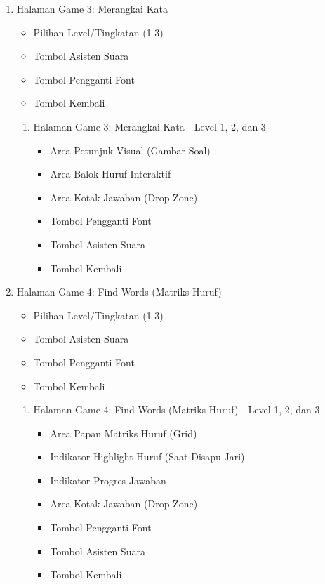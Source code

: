 \documentclass[12pt,a4paper]{report}
\begin{document}
\begin{enumerate}
\item Halaman Game 3: Merangkai Kata
    \begin{itemize}
    \item Pilihan Level/Tingkatan (1-3)
    \item Tombol Asisten Suara
    \item Tombol Pengganti Font
    \item Tombol Kembali
    \end{itemize}
    
    \begin{enumerate}[label=\arabic{enumi}\alph*.]
        \item Halaman Game 3: Merangkai Kata - Level 1, 2, dan 3
        \begin{itemize}
    \item Area Petunjuk Visual (Gambar Soal)
    \item Area Balok Huruf Interaktif
    \item Area Kotak Jawaban (Drop Zone)
    \item Tombol Pengganti Font
    \item Tombol Asisten Suara
    \item Tombol Kembali
    \end{itemize}
    \end{enumerate}

\item Halaman Game 4: Find Words (Matriks Huruf)
    \begin{itemize}
    \item Pilihan Level/Tingkatan (1-3)
    \item Tombol Asisten Suara
    \item Tombol Pengganti Font
    \item Tombol Kembali
    \end{itemize}
    
    \begin{enumerate}[label=\arabic{enumi}\alph*.]
        \item Halaman Game 4: Find Words (Matriks Huruf) - Level 1, 2, dan 3
        \begin{itemize}
    \item Area Papan Matriks Huruf (Grid)
    \item Indikator Highlight Huruf (Saat Disapu Jari)
    \item Indikator Progres Jawaban
    \item Area Kotak Jawaban (Drop Zone)
    \item Tombol Pengganti Font
    \item Tombol Asisten Suara
    \item Tombol Kembali
    \end{itemize}
    \end{enumerate}


\end{enumerate}
\end{document}
